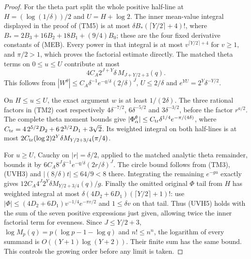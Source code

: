 \documentclass[11pt]{article}
\theoremstyle{remark}\newtheorem{remark}[theorem]{Remark}
\begin{document}
\begin{proof}
For the theta part split the whole positive half-line at
$H=(\log(1/\delta))/2$ and $U=H+\log2$.
The inner mean-value integral displayed in the proof of
(TM5) is at most
$\delta B_*(\lceil Y/2\rceil+4)!$, where
$B_*=2B_3+16B_2+18B_1+(9/4)B_0$;
these are the four fixed derivative constants of (MEB).
Every power in that integral is at most
$v^{\lceil Y/2\rceil+4}$ for $v\ge1$, and $\pi/2>1$,
which proves the factorial estimate directly.
The matched theta terms on $0\le u\le U$ contribute at most
\[
 4C_A2^{J+Y}\delta\,M_{J+Y/2+3}(q).
\]
This follows from
$|W^\theta|\le C_A\delta^{-1}e^{-q/\delta}(2/\delta)^J$,
$U\le2/\delta$ and $e^{YU}=2^Y\delta^{-Y/2}$.

On $H\le u\le U$, the exact argument $w$ is at least
$1/(2\delta)$. The three rational factors in (TM2)
cost respectively $4\delta^{-7/2}$,
$6\delta^{-5/2}$ and $3\delta^{-3/2}$, before
the factor $r^{a/2}$. The complete theta moment bounds
give $|\Phi_\alpha^\theta|\le
C_{\rm tr}\delta^{1/4}e^{-\pi/(4\delta)}$, where
$C_{\rm tr}=4\,2^{5/2}D_2+6\,2^{3/2}D_1+3\sqrt2$.
Its weighted integral on both half-lines is at most
$2C_{\rm tr}(\log2)2^Y\delta M_{Y/2+3/4}(\pi/4)$.

For $u\ge U$, Cauchy on $|r|=\delta/2$, applied to
the matched analytic theta remainder, bounds it by
$6C_A8^J\delta^{-1}e^{-q/\delta}(2r/\delta)^J$.
The circle bound follows from (TM3), (UVH3) and
$|(8/\delta)t|\le64/9<8$ there. Integrating the
remaining $e^{-gu}$ exactly gives
$12C_A4^J2^Y\delta M_{Y/2+3/4}(q)/g$.
Finally the omitted original $\Phi$ tail from $H$ has
weighted integral at most
$\delta(4D_2+6D_1)(\lceil Y/2\rceil+1)!$:
use $|\Phi|\le(4D_2+6D_1)v^{-1/4}e^{-\pi v/2}$
and $1\le\delta v$ on that tail.
Thus (UVH5) holds with the sum of the seven positive
expressions just given, allowing twice the inner factorial
term for evenness. Since $J\le Y/2+3$,
$\log M_p(q)=p(\log p-1-\log q)$ and $n!\le n^n$,
the logarithm of every summand is
$O((Y+1)\log(Y+2))$. Their finite sum has the same bound.
This controls the growing order before any limit is taken.


\end{proof}
\end{document}
